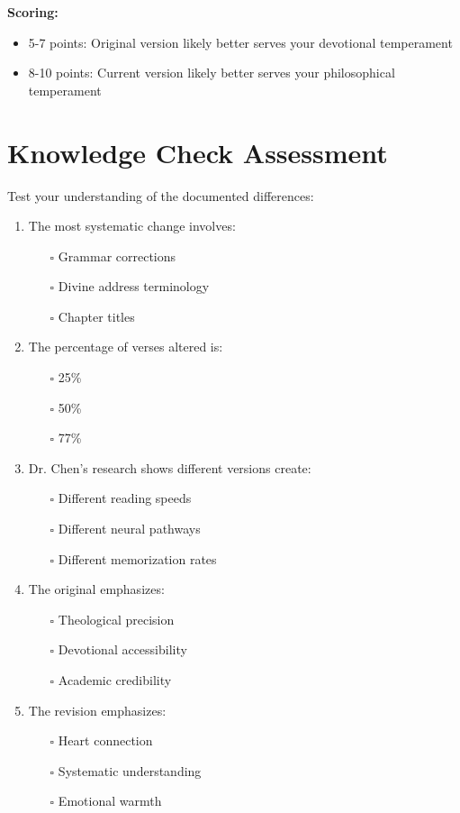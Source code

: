 \documentclass[11pt,twoside]{book}
\begin{document}
\textbf{\textbf{Scoring:}}
\begin{itemize}
\item 5-7 points: Original version likely better serves your devotional temperament
\item 8-10 points: Current version likely better serves your philosophical temperament
\end{itemize}
\section*{Knowledge Check Assessment}
\label{sec:org4f76276}

Test your understanding of the documented differences:

\begin{enumerate}
\item The most systematic change involves:
\begin{itemize}
\item[{$\square$}] Grammar corrections
\item[{$\square$}] Divine address terminology
\item[{$\square$}] Chapter titles
\end{itemize}

\item The percentage of verses altered is:
\begin{itemize}
\item[{$\square$}] 25\%
\item[{$\square$}] 50\%
\item[{$\square$}] 77\%
\end{itemize}

\item Dr. Chen's research shows different versions create:
\begin{itemize}
\item[{$\square$}] Different reading speeds
\item[{$\square$}] Different neural pathways
\item[{$\square$}] Different memorization rates
\end{itemize}

\item The original emphasizes:
\begin{itemize}
\item[{$\square$}] Theological precision
\item[{$\square$}] Devotional accessibility
\item[{$\square$}] Academic credibility
\end{itemize}

\item The revision emphasizes:
\begin{itemize}
\item[{$\square$}] Heart connection
\item[{$\square$}] Systematic understanding
\item[{$\square$}] Emotional warmth
\end{itemize}
\end{enumerate}
\end{document}
